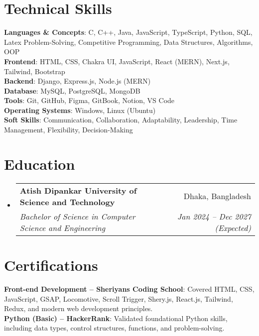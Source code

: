 \documentclass[a4paper,11pt]{article}
\makeatletter
\newcommand{\resumeSubheading}[4]{
  \vspace{-2pt}\item
    \begin{tabular*}{0.97\textwidth}[t]{l@{\extracolsep{\fill}}r}
      \textbf{#1} & #2 \\
      \textit{\small#3} & \textit{\small #4} \\
    \end{tabular*}\vspace{-7pt}
}
\newcommand{\resumeSubHeadingListStart}{\begin{itemize}[leftmargin=0.15in, label={}]}
\newcommand{\resumeSubHeadingListEnd}{\end{itemize}}
\makeatother
\begin{document}
\section{Technical Skills}
 \begin{itemize}[leftmargin=0.15in, label={}]
    \small{\item{
     \textbf{Languages \& Concepts}{: C, C++, Java, JavaScript, TypeScript, Python, SQL, Latex Problem-Solving, Competitive Programming, Data Structures, Algorithms, OOP} \\
     \textbf{Frontend}{: HTML, CSS, Chakra UI, JavaScript, React (MERN), Next.js, Tailwind, Bootstrap} \\
     \textbf{Backend}{: Django, Express.js, Node.js (MERN)} \\
     \textbf{Database}{: MySQL, PostgreSQL, MongoDB} \\
     \textbf{Tools}{: Git, GitHub, Figma, GitBook, Notion, VS Code} \\
     \textbf{Operating Systems}{: Windows, Linux (Ubuntu)} \\
     \textbf{Soft Skills}{: Communication, Collaboration, Adaptability, Leadership, Time Management, Flexibility, Decision-Making}
    }}
 \end{itemize}

\section{Education}
  \resumeSubHeadingListStart
    \resumeSubheading
      {Atish Dipankar University of Science and Technology}{Dhaka, Bangladesh}
      {Bachelor of Science in Computer Science and Engineering }{Jan 2024 -- Dec 2027 (Expected)}
  \resumeSubHeadingListEnd

\section{Certifications}
  \begin{itemize}[leftmargin=0.15in, label={}]
    \small{\item{
      \textbf{Front-end Development – Sheriyans Coding School}{: Covered HTML, CSS, JavaScript, GSAP, Locomotive, Scroll Trigger, Shery.js, React.js, Tailwind, Redux, and modern web development principles.} \\
      \textbf{Python (Basic) – HackerRank}{: Validated foundational Python skills, including data types, control structures, functions, and problem-solving.}
    }}
  \end{itemize}
\end{document}
